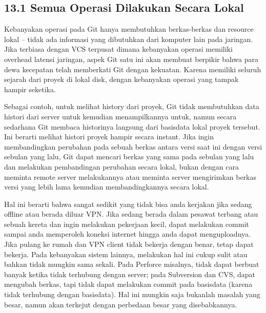 \subsection*{13.1 Semua Operasi Dilakukan Secara Lokal }
\par
Kebanyakan operasi pada Git hanya membutuhkan berkas-berkas dan resource lokal – tidak ada informasi yang dibutuhkan dari komputer lain pada jaringan. Jika terbiasa dengan VCS terpusat dimana kebanyakan operasi memiliki overhead latensi jaringan, aspek Git satu ini akan membuat berpikir bahwa para dewa kecepatan telah memberkati Git dengan kekuatan. Karena memiliki seluruh sejarah dari proyek di lokal disk, dengan kebanyakan operasi yang tampak hampir seketika. \par
Sebagai contoh, untuk melihat history dari proyek, Git tidak membutuhkan data histori dari server untuk kemudian menampilkannya untuk, namun secara sedarhana Git membaca historinya langsung dari basisdata lokal proyek tersebut. Ini berarti melihat histori proyek hampir secara instant. Jika ingin membandingkan perubahan pada sebuah berkas antara versi saat ini dengan versi sebulan yang lalu, Git dapat mencari berkas yang sama pada sebulan yang lalu dan melakukan pembandingan perubahan secara lokal, bukan dengan cara meminta remote server melakukannya atau meminta server mengirimkan berkas versi yang lebih lama kemudian membandingkannya secara lokal. \par
Hal ini berarti bahwa sangat sedikit yang tidak bisa anda kerjakan jika sedang offline atau berada diluar VPN. Jika sedang berada dalam pesawat terbang atau sebuah kereta dan ingin melakukan pekerjaan kecil, dapat melakukan commit sampai anda memperoleh koneksi internet hingga anda dapat menguploadnya. Jika pulang ke rumah dan VPN client tidak bekerja dengan benar, tetap dapat bekerja. Pada kebanyakan sistem lainnya, melakukan hal ini cukup sulit atau bahkan tidak mungkin sama sekali. Pada Perforce misalnya, tidak dapat berbuat banyak ketika tidak terhubung dengan server; pada Subversion dan CVS,  dapat mengubah berkas, tapi tidak dapat melakukan commit pada basisdata (karena tidak terhubung dengan basisdata). Hal ini mungkin saja bukanlah masalah yang besar, namun akan terkejut dengan perbedaan besar yang disebabkannya. \par

